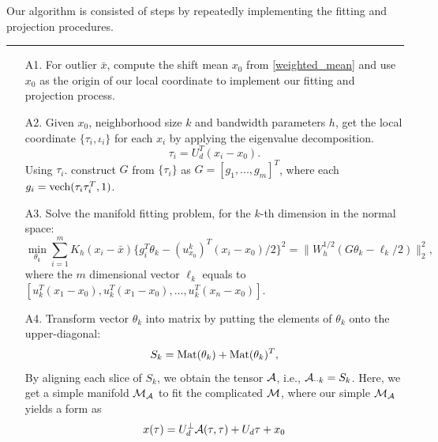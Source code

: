 \documentclass[aos,preprint]{imsart}
\theoremstyle{remark}
\begin{document}
Our algorithm is consisted of steps by repeatedly implementing the fitting and projection procedures.

\vspace{-3mm}\hspace{-4mm}\rule[-10pt]{\linewidth}{0.05em}

\vspace{2mm}\hspace{-4mm}{\bf Repeat: from A1 to B3}

\hspace{-4mm}{\it The fitting procedure contains the following four steps:}
\begin{itemize}
\item[A1.] For outlier $\bar{x}$, compute the shift mean $x_0$ from \eqref{weighted_mean} and use $x_0$ as the origin of our local coordinate to implement our fitting and projection process.
\item[A2.] Given $x_0$, neighborhood size $k$ and bandwidth parameters $h$, get the local coordinate $\{\tau_i, \iota_i\}$ for each $x_i$ by applying the eigenvalue decomposition.
\[
{\tau}_i = U_d^T(x_i-x_0).%
\]
Using $\tau_i$. construct $G$ from $\{\tau_i\}$ as $G = [g_1,...,g_m]^T$, where each $g_i = {\rm vech}(\tau_i\tau_i^T, 1)$.%
\item[A3.] Solve the manifold fitting problem, for the $k$-th dimension in the normal space:
\[
  \min_{\theta_k} \sum_{i=1}^m K_h(x_i-\bar{x})\{ g_i^T \theta_k  -  {(u^k_{x_0})}^T (x_i -x_0)/2\}^2
= \|W_h^{1/2}(G \theta_k-\ell_k/2) \|_2^2,
\]
where the $m$ dimensional vector $\ell_k$ equals to $[u_k^T(x_1-x_0), u_k^T(x_1-x_0),...,u_k^T(x_n-x_0)]$.
\item[A4.] Transform vector $\theta_k$ into matrix by putting the elements of $\theta_k$ onto the upper-diagonal: %
\[
S_k = {\rm Mat}(\theta_k) + {\rm Mat}(\theta_k) ^T,
\]
By aligning each slice of $S_k$, we obtain the tensor $\cal A$, i.e., ${\cal A}_{\cdot \cdot k}=S_k$.
Here, we get a simple manifold ${\cal M_A}$ to fit the complicated $\cal M$, where our simple ${\cal M_A}$ yields a form as
\[
x(\tau) = U_{d}^{\perp} {\cal A} (\tau, \tau) + U_d \tau +x_0
\]
\end{itemize}
\end{document}
